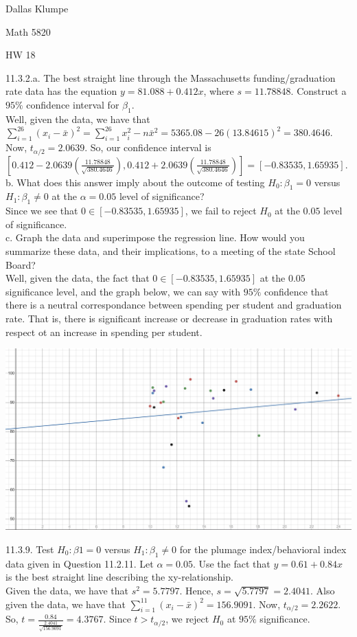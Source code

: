 \documentclass[12pt]{article}
\begin{document}
\noindent Dallas Klumpe

\noindent Math 5820

\noindent HW 18

11.3.2.a. The best straight line through the Massachusetts funding/graduation rate data has the equation $y=81.088+0.412x$, where $s=11.78848$. Construct a $95\%$ confidence interval for $\beta_1$.\\
Well, given the data, we have that $\sum_{i=1}^26(x_i-\bar{x})^2=\sum_{i=1}^26x_i^2-n\bar{x}^2=5365.08-26(13.84615)^2=380.4646$. Now, $t_{\alpha/2}=2.0639$. So, our confidence interval is $[0.412-2.0639(\frac{11.78848}{\sqrt{380.4646}}), 0.412+2.0639(\frac{11.78848}{\sqrt{380.4646}})]=[-0.83535, 1.65935]$.\\
b. What does this answer imply about the outcome of testing $H_0:\beta_1=0$ versus $H_1:\beta_1\neq0$ at the $\alpha=0.05$ level of significance?\\
Since we see that $0\in[-0.83535, 1.65935]$, we fail to reject $H_0$ at the $0.05$ level of significance.\\
c. Graph the data and superimpose the regression line. How would you summarize these data, and their implications, to a meeting of the state School Board?\\
Well, given the data, the fact that $0\in[-0.83535, 1.65935]$ at the $0.05$ significance level, and the graph below, we can say with $95\%$ confidence that there is a neutral correspondance between spending per student and graduation rate. That is, there is significant increase or decrease in graduation rates with respect ot an increase in spending per student.
\begin{center}
\includegraphics[scale=0.4]{11-3-2.JPG}\\[20pt]
\end{center}

11.3.9. Test $H_0:\beta1=0$ versus $H_1:\beta_1\neq0$ for the plumage index/behavioral index data given in Question 11.2.11. Let $\alpha=0.05$. Use the fact that $y=0.61+0.84x$ is the best straight line describing the xy-relationship.\\
Given the data, we have that $s^2=5.7797$. Hence, $s=\sqrt{5.7797}=2.4041$. Also given the data, we have that $\sum_{i=1}^{11}(x_i-\bar{x})^2=156.9091$. Now, $t_{\alpha/2}=2.2622$. So, $t=\frac{0.84}{\frac{2.4041}{\sqrt{156.9091}}}=4.3767$. Since $t>t_{\alpha/2}$, we reject $H_0$ at $95\%$ significance.\\[20pt]
\end{document}
